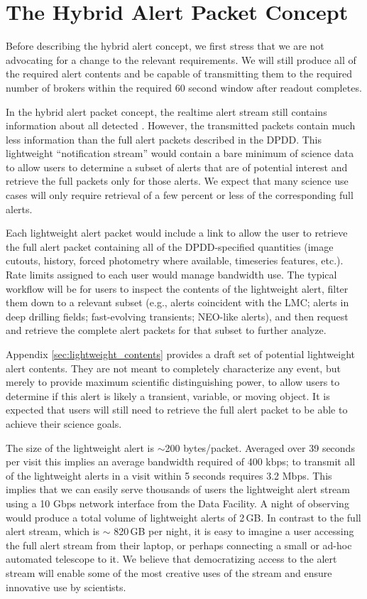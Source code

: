 \documentclass[DM,authoryear,toc]{lsstdoc}
\begin{document}
\section{The Hybrid Alert Packet Concept}

Before describing the hybrid alert concept, we first stress that we are not advocating for a change to the relevant requirements.
We will still produce all of the required alert contents and be capable of transmitting them to the required number of brokers within the required 60 second window after readout completes.

In the hybrid alert packet concept, the realtime alert stream still contains information about all detected \DIASources.
However, the transmitted packets contain much less information than the full alert packets described in the DPDD.
This lightweight ``notification stream'' would contain a bare minimum of science data to allow users to determine a subset of alerts that are of potential interest and retrieve the full packets only for those alerts.
We expect that many science use cases will only require retrieval of a few percent or less of the corresponding full alerts.

Each lightweight alert packet would include a link to allow the user to retrieve the full alert packet containing all of the DPDD-specified quantities (image cutouts, \DIASource history, forced photometry where available, timeseries features, etc.).
Rate limits assigned to each user would manage bandwidth use.
The typical workflow will be for users to inspect the contents of the lightweight alert, filter them down to a relevant subset (e.g., alerts coincident with the LMC; alerts in deep drilling fields; fast-evolving transients; NEO-like alerts), and then request and retrieve the complete alert packets for that subset to further analyze.

Appendix \ref{sec:lightweight_contents} provides a draft set of potential lightweight alert contents.
They are not meant to completely characterize any event, but merely to provide maximum scientific distinguishing power, to allow users to determine if this alert is likely a transient, variable, or moving object.
It is expected that users will still need to retrieve the full alert packet to be able to achieve their science goals.

The size of the lightweight alert is $\sim$200 bytes/packet.
Averaged over 39 seconds per visit this implies an average bandwidth required of 400 kbps; to transmit all of the lightweight alerts in a visit within 5 seconds requires 3.2 Mbps.
This implies that we can easily serve thousands of users the lightweight alert stream using a 10 Gbps network interface from the Data Facility.
A night of observing would produce a total volume of lightweight alerts of 2\,GB.
In contrast to the full alert stream, which is $\sim$ 820\,GB per night, it is easy to imagine a user accessing the full alert stream from their laptop, or perhaps connecting a small or ad-hoc automated telescope to it.
We believe that democratizing access to the alert stream will enable some of the most creative uses of the stream and ensure innovative use by scientists.
\end{document}
